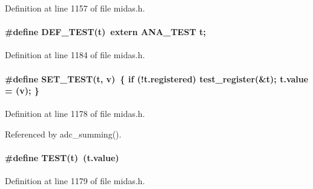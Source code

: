 Definition at line 1157 of file midas.h.
\paragraph[{DEF\_\-TEST}]{\setlength{\rightskip}{0pt plus 5cm}\#define DEF\_\-TEST(t)~extern {\bf ANA\_\-TEST} t;}\hfill\label{group__manalyzer_ga7d718f7e1f79e8400dbf4597502026e8}


Definition at line 1184 of file midas.h.
\paragraph[{SET\_\-TEST}]{\setlength{\rightskip}{0pt plus 5cm}\#define SET\_\-TEST(t, \/  v)~\{ if (!t.registered) test\_\-register(\&t); t.value = (v); \}}\hfill\label{group__manalyzer_ga1e5d03dfd4e2fe1c23fdd43fd94f74dd}


Definition at line 1178 of file midas.h.

Referenced by adc\_\-summing().
\paragraph[{TEST}]{\setlength{\rightskip}{0pt plus 5cm}\#define TEST(t)~(t.value)}\hfill\label{group__manalyzer_gae6020b0d1d8e21377be3bc639332f4e5}


Definition at line 1179 of file midas.h.